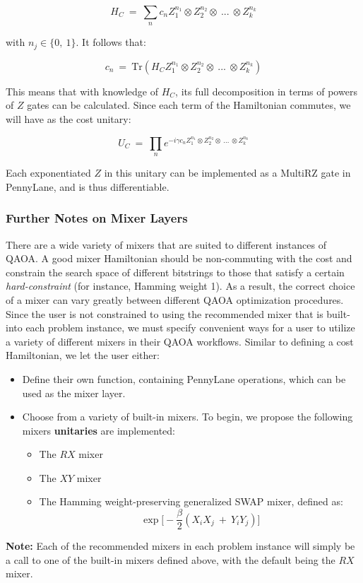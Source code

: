 \documentclass{article}
\begin{document}
$$H_C \ = \ \displaystyle\sum_{n} c_n Z_1^{n_1} \otimes Z_2^{n_2} \otimes \ ... \ \otimes Z_{k}^{n_k}$$

\noindent
with $n_j \in \{0, \ 1\}$. It follows that:

$$c_n \ = \ \text{Tr}( H_C Z_1^{n_1} \otimes Z_2^{n_2} \otimes \ ... \ \otimes Z_{k}^{n_k})$$

\noindent
This means that with knowledge of $H_C$, its full decomposition in terms of powers 
of $Z$ gates can be calculated. Since each term of the Hamiltonian commutes, we 
will have as the cost unitary:

$$U_C \ = \ \displaystyle\prod_{n} e^{- i \gamma c_n Z_1^{n_1} \otimes Z_2^{n_2} \otimes \ ... \ \otimes Z_{k}^{n_k}}$$

\noindent
Each exponentiated $Z$ in this unitary can be implemented as a MultiRZ gate in
PennyLane, and is thus differentiable.

\subsubsection{Further Notes on Mixer Layers}

There are a wide variety of mixers that are suited to different instances of QAOA. A good mixer 
Hamiltonian should be non-commuting with the cost and constrain the search space of different bitstrings 
to those that satisfy a certain \textit{hard-constraint} (for instance, Hamming weight 1). As a result, the correct 
choice of a mixer can vary greatly between different QAOA optimization procedures.
\newline\newline
\noindent
Since the user is not constrained to using the recommended mixer that is built-into each 
problem instance, we must specify convenient ways for a user to utilize a variety of different 
mixers in their QAOA workflows.
\newline\newline
\noindent
Similar to defining a cost Hamiltonian, we let the user either: 
\begin{itemize}
	\item Define their own function, 
	      containing PennyLane operations, which 
	      can be used as the mixer layer. 
	\item Choose from a variety of built-in mixers.
              To begin, we propose the following mixers \textbf{unitaries} are implemented:

		\begin{itemize}
			\item The $RX$ mixer
			\item The $XY$ mixer
			\item The Hamming weight-preserving generalized SWAP mixer, defined as:
				$$\exp \Big[ - \frac{\beta}{2} (X_{i} X_{j} \ + \ Y_{i} Y_{j}) \Big]$$
		\end{itemize}
\end{itemize}
\noindent
\textbf{Note:} Each of the recommended mixers in each problem instance will simply be a call 
to one of the built-in mixers defined above, with the default being the $RX$ mixer.
\end{document}
